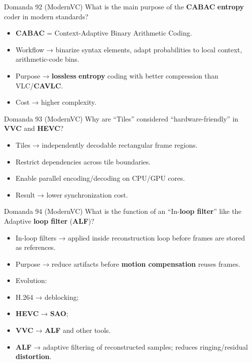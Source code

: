 \begin{questionbox}{Domanda 92}
(ModernVC) What is the main purpose of the \textbf{CABAC} \textbf{entropy} coder in modern standards?
\end{questionbox}


\begin{itemize}
  \item \textbf{\textbf{CABAC}} = Context-Adaptive Binary Arithmetic Coding.
  \item Workflow → binarize syntax elements, adapt probabilities to local context, arithmetic-code bins.
  \item Purpose → \textbf{lossless} \textbf{entropy} coding with better compression than VLC/\textbf{CAVLC}.
  \item Cost → higher complexity.
\end{itemize}



\begin{questionbox}{Domanda 93}
(ModernVC) Why are “Tiles” considered “hardware-friendly” in \textbf{VVC} and \textbf{HEVC}?
\end{questionbox}


\begin{itemize}
  \item Tiles → independently decodable rectangular frame regions.
  \item Restrict dependencies across tile boundaries.
  \item Enable parallel encoding/decoding on CPU/GPU cores.
  \item Result → lower synchronization cost.
\end{itemize}



\begin{questionbox}{Domanda 94}
(ModernVC) What is the function of an “In-\textbf{loop filter}” like the Adaptive \textbf{loop filter} (\textbf{ALF})?
\end{questionbox}


\begin{itemize}
  \item In-loop filters → applied inside reconstruction loop before frames are stored as references.
  \item Purpose → reduce artifacts before \textbf{motion compensation} reuses frames.
  \item Evolution:
  \item H.264 → deblocking;
  \item \textbf{HEVC} → \textbf{SAO};
  \item \textbf{VVC} → \textbf{ALF} and other tools.
  \item \textbf{\textbf{ALF}} → adaptive filtering of reconstructed samples; reduces ringing/residual \textbf{distortion}.
\end{itemize}



